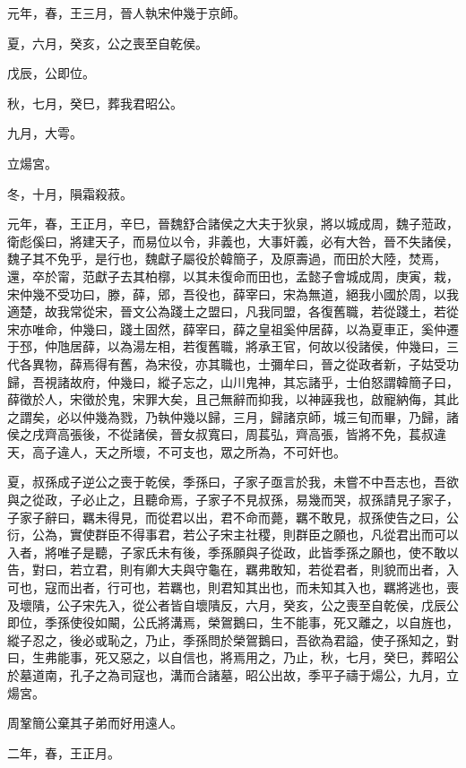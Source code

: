 
\begin{pinyinscope}
元年，春，王三月，晉人執宋仲幾于京師。

夏，六月，癸亥，公之喪至自乾侯。

戊辰，公即位。

秋，七月，癸巳，葬我君昭公。

九月，大雩。

立煬宮。

冬，十月，隕霜殺菽。

元年，春，王正月，辛巳，晉魏舒合諸侯之大夫于狄泉，將以城成周，魏子蒞政，衛彪傒曰，將建天子，而易位以令，非義也，大事奸義，必有大咎，晉不失諸侯，魏子其不免乎，是行也，魏獻子屬役於韓簡子，及原壽過，而田於大陸，焚焉，還，卒於甯，范獻子去其柏槨，以其未復命而田也，孟懿子會城成周，庚寅，栽，宋仲幾不受功曰，滕，薛，郳，吾役也，薛宰曰，宋為無道，絕我小國於周，以我適楚，故我常從宋，晉文公為踐土之盟曰，凡我同盟，各復舊職，若從踐土，若從宋亦唯命，仲幾曰，踐土固然，薛宰曰，薛之皇祖奚仲居薛，以為夏車正，奚仲遷于邳，仲虺居薛，以為湯左相，若復舊職，將承王官，何故以役諸侯，仲幾曰，三代各異物，薛焉得有舊，為宋役，亦其職也，士彌牟曰，晉之從政者新，子姑受功歸，吾視諸故府，仲幾曰，縱子忘之，山川鬼神，其忘諸乎，士伯怒謂韓簡子曰，薛徵於人，宋徵於鬼，宋罪大矣，且己無辭而抑我，以神誣我也，啟寵納侮，其此之謂矣，必以仲幾為戮，乃執仲幾以歸，三月，歸諸京師，城三旬而畢，乃歸，諸侯之戌齊高張後，不從諸侯，晉女叔寬曰，周萇弘，齊高張，皆將不免，萇叔違天，高子違人，天之所壞，不可支也，眾之所為，不可奸也。

夏，叔孫成子逆公之喪于乾侯，季孫曰，子家子亟言於我，未嘗不中吾志也，吾欲與之從政，子必止之，且聽命焉，子家子不見叔孫，易幾而哭，叔孫請見子家子，子家子辭曰，羈未得見，而從君以出，君不命而薨，羈不敢見，叔孫使告之曰，公衍，公為，實使群臣不得事君，若公子宋主社稷，則群臣之願也，凡從君出而可以入者，將唯子是聽，子家氏未有後，季孫願與子從政，此皆季孫之願也，使不敢以告，對曰，若立君，則有卿大夫與守龜在，羈弗敢知，若從君者，則貌而出者，入可也，寇而出者，行可也，若羈也，則君知其出也，而未知其入也，羈將逃也，喪及壞隤，公子宋先入，從公者皆自壞隤反，六月，癸亥，公之喪至自乾侯，戊辰公即位，季孫使役如闞，公氏將溝焉，榮鴐鵝曰，生不能事，死又離之，以自旌也，縱子忍之，後必或恥之，乃止，季孫問於榮鴐鵝曰，吾欲為君謚，使子孫知之，對曰，生弗能事，死又惡之，以自信也，將焉用之，乃止，秋，七月，癸巳，葬昭公於墓道南，孔子之為司寇也，溝而合諸墓，昭公出故，季平子禱于煬公，九月，立煬宮。

周鞏簡公棄其子弟而好用遠人。

二年，春，王正月。


\end{pinyinscope}
